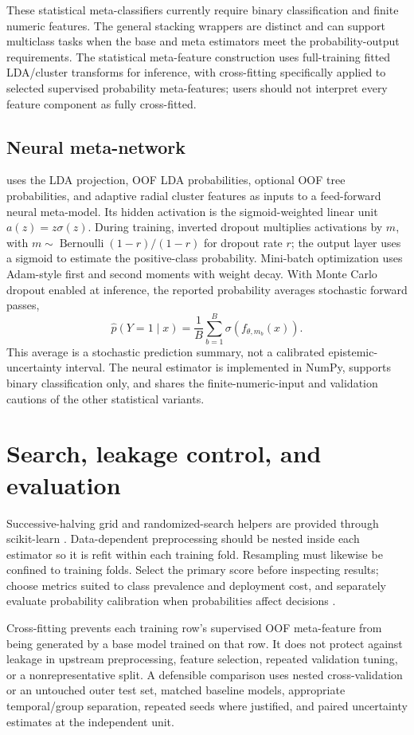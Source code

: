 \documentclass[conference]{IEEEtran}
\begin{document}
These statistical meta-classifiers currently require binary classification and finite numeric features. The general stacking wrappers are distinct and can support multiclass tasks when the base and meta estimators meet the probability-output requirements. The statistical meta-feature construction uses full-training fitted LDA/cluster transforms for inference, with cross-fitting specifically applied to selected supervised probability meta-features; users should not interpret every feature component as fully cross-fitted.

\subsection{Neural meta-network}
 uses the LDA projection, OOF LDA probabilities, optional OOF tree probabilities, and adaptive radial cluster features as inputs to a feed-forward neural meta-model. Its hidden activation is the sigmoid-weighted linear unit \(a(z)=z\sigma(z)\). During training, inverted dropout multiplies activations by \(m\), with \(m\sim\operatorname{Bernoulli}(1-r)/(1-r)\) for dropout rate \(r\); the output layer uses a sigmoid to estimate the positive-class probability. Mini-batch optimization uses Adam-style first and second moments with weight decay. With Monte Carlo dropout enabled at inference, the reported probability averages stochastic forward passes,
\[
\hat p(Y=1\mid x)=\frac1{B}\sum_{b=1}^{B}\sigma\!\left(f_{\theta,m_b}(x)\right).
\]
This average is a stochastic prediction summary, not a calibrated epistemic-uncertainty interval. The neural estimator is implemented in NumPy, supports binary classification only, and shares the finite-numeric-input and validation cautions of the other statistical variants.

\section{Search, leakage control, and evaluation}
Successive-halving grid and randomized-search helpers are provided through scikit-learn \cite{pedregosa2011}. Data-dependent preprocessing should be nested inside each estimator so it is refit within each training fold. Resampling must likewise be confined to training folds. Select the primary score before inspecting results; choose metrics suited to class prevalence and deployment cost, and separately evaluate probability calibration when probabilities affect decisions \cite{hastie2009}.

Cross-fitting prevents each training row's supervised OOF meta-feature from being generated by a base model trained on that row. It does not protect against leakage in upstream preprocessing, feature selection, repeated validation tuning, or a nonrepresentative split. A defensible comparison uses nested cross-validation or an untouched outer test set, matched baseline models, appropriate temporal/group separation, repeated seeds where justified, and paired uncertainty estimates at the independent unit.
\end{document}

